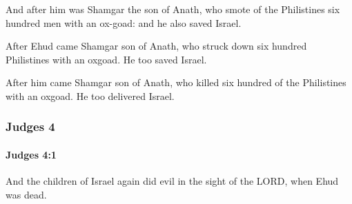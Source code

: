 			\begin{versebox}
					\item[BHS] 
					\item[ASV] And after him was Shamgar the son of Anath, who smote of the Philistines six hundred men with an ox-goad: and he also saved Israel.
					\item[NIV] After Ehud came Shamgar son of Anath, who struck down six hundred Philistines with an oxgoad. He too saved Israel.
					\item[NRSV] After him came Shamgar son of Anath, who killed six hundred of the Philistines with an oxgoad. He too delivered Israel.
			\end{versebox}
	\subsubsection{Judges 4} %
		\label{JUDGES-4}

		\paragraph{Judges 4:1} %
			\label{JUDGES-4-1}

			And the children of Israel again did evil in the sight of the LORD, when Ehud was dead.

